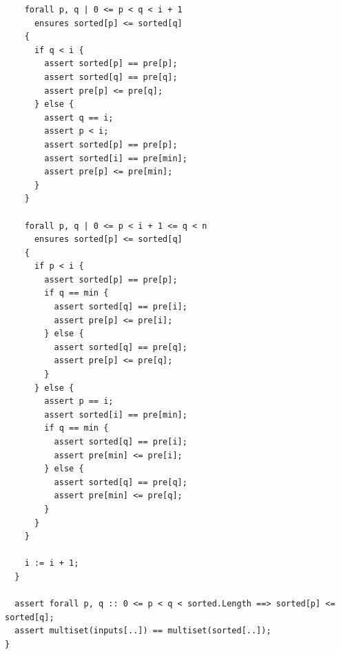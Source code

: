 \documentclass{article}
\begin{document}
\begin{lstlisting}
    forall p, q | 0 <= p < q < i + 1
      ensures sorted[p] <= sorted[q]
    {
      if q < i {
        assert sorted[p] == pre[p];
        assert sorted[q] == pre[q];
        assert pre[p] <= pre[q];
      } else {
        assert q == i;
        assert p < i;
        assert sorted[p] == pre[p];
        assert sorted[i] == pre[min];
        assert pre[p] <= pre[min];
      }
    }

    forall p, q | 0 <= p < i + 1 <= q < n
      ensures sorted[p] <= sorted[q]
    {
      if p < i {
        assert sorted[p] == pre[p];
        if q == min {
          assert sorted[q] == pre[i];
          assert pre[p] <= pre[i];
        } else {
          assert sorted[q] == pre[q];
          assert pre[p] <= pre[q];
        }
      } else {
        assert p == i;
        assert sorted[i] == pre[min];
        if q == min {
          assert sorted[q] == pre[i];
          assert pre[min] <= pre[i];
        } else {
          assert sorted[q] == pre[q];
          assert pre[min] <= pre[q];
        }
      }
    }

    i := i + 1;
  }

  assert forall p, q :: 0 <= p < q < sorted.Length ==> sorted[p] <= sorted[q];
  assert multiset(inputs[..]) == multiset(sorted[..]);
}
\end{lstlisting}
\end{document}
